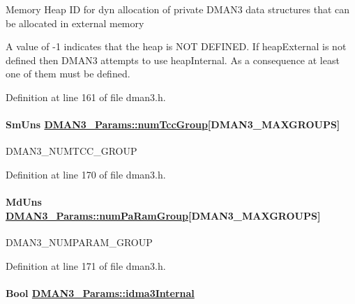 Memory Heap ID for dyn allocation of private DMAN3 data structures that can be allocated in external memory

A value of -1 indicates that the heap is NOT DEFINED. If heap\-External is not defined then DMAN3 attempts to use heap\-Internal. As a consequence at least one of them must be defined. 

Definition at line 161 of file dman3.h.\hypertarget{struct_d_m_a_n3___params_d431ed7c6e66d11a1c1cdbf9518494f0}{
\paragraph[numTccGroup]{\setlength{\rightskip}{0pt plus 5cm}Sm\-Uns \hyperlink{struct_d_m_a_n3___params_d431ed7c6e66d11a1c1cdbf9518494f0}{DMAN3\_\-Params::num\-Tcc\-Group}\mbox{[}DMAN3\_\-MAXGROUPS\mbox{]}}\hfill}
\label{struct_d_m_a_n3___params_d431ed7c6e66d11a1c1cdbf9518494f0}


DMAN3\_\-NUMTCC\_\-GROUP 

Definition at line 170 of file dman3.h.\hypertarget{struct_d_m_a_n3___params_b722aece79c8c43eadd6b30d3a828a74}{
\paragraph[numPaRamGroup]{\setlength{\rightskip}{0pt plus 5cm}Md\-Uns \hyperlink{struct_d_m_a_n3___params_b722aece79c8c43eadd6b30d3a828a74}{DMAN3\_\-Params::num\-Pa\-Ram\-Group}\mbox{[}DMAN3\_\-MAXGROUPS\mbox{]}}\hfill}
\label{struct_d_m_a_n3___params_b722aece79c8c43eadd6b30d3a828a74}


DMAN3\_\-NUMPARAM\_\-GROUP 

Definition at line 171 of file dman3.h.\hypertarget{struct_d_m_a_n3___params_c1550ea0e1f8b5442f88eccc395a491c}{
\paragraph[idma3Internal]{\setlength{\rightskip}{0pt plus 5cm}Bool \hyperlink{struct_d_m_a_n3___params_c1550ea0e1f8b5442f88eccc395a491c}{DMAN3\_\-Params::idma3Internal}}\hfill}
\label{struct_d_m_a_n3___params_c1550ea0e1f8b5442f88eccc395a491c}


